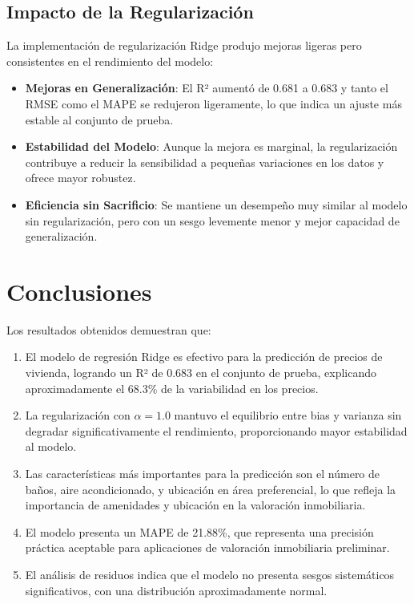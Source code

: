 \documentclass[11pt,a4paper]{article}
\begin{document}
\subsection{Impacto de la Regularización}

La implementación de regularización Ridge produjo mejoras ligeras pero consistentes en el rendimiento del modelo:

\begin{itemize}
    \item \textbf{Mejoras en Generalización}: El R² aumentó de 0.681 a 0.683 y tanto el RMSE como el MAPE se redujeron ligeramente, lo que indica un ajuste más estable al conjunto de prueba.
    \item \textbf{Estabilidad del Modelo}: Aunque la mejora es marginal, la regularización contribuye a reducir la sensibilidad a pequeñas variaciones en los datos y ofrece mayor robustez.
    \item \textbf{Eficiencia sin Sacrificio}: Se mantiene un desempeño muy similar al modelo sin regularización, pero con un sesgo levemente menor y mejor capacidad de generalización.
\end{itemize}


\section{Conclusiones}

Los resultados obtenidos demuestran que:

\begin{enumerate}
    \item El modelo de regresión Ridge es efectivo para la predicción de precios de vivienda, logrando un R² de 0.683 en el conjunto de prueba, explicando aproximadamente el 68.3\% de la variabilidad en los precios.
    \item La regularización con $\alpha = 1.0$ mantuvo el equilibrio entre bias y varianza sin degradar significativamente el rendimiento, proporcionando mayor estabilidad al modelo.
    \item Las características más importantes para la predicción son el número de baños, aire acondicionado, y ubicación en área preferencial, lo que refleja la importancia de amenidades y ubicación en la valoración inmobiliaria.
    \item El modelo presenta un MAPE de 21.88\%, que representa una precisión práctica aceptable para aplicaciones de valoración inmobiliaria preliminar.
    \item El análisis de residuos indica que el modelo no presenta sesgos sistemáticos significativos, con una distribución aproximadamente normal.
\end{enumerate}
\end{document}
